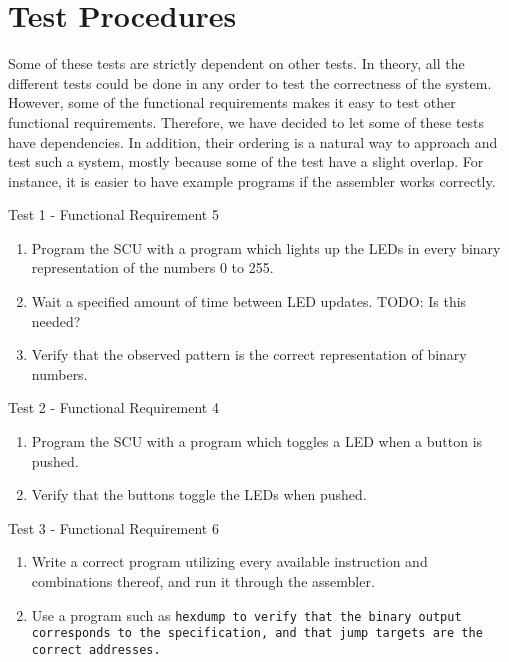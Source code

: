 \section{Test Procedures}

Some of these tests are strictly dependent on other tests. In theory, all the
different tests could be done in any order to test the correctness of the
system. However, some of the functional requirements makes it easy to test other
functional requirements. Therefore, we have decided to let some of these tests
have dependencies. In addition, their ordering is a natural way to approach and
test such a system, mostly because some of the test have a slight overlap. For
instance, it is easier to have example programs if the assembler works
correctly.

{\sc Test 1 - Functional Requirement 5}

{\em \FRV}

\begin{enumerate}
\item Program the \ac{SCU} with a program which lights up the \acp{LED} in every
  binary representation of the numbers 0 to 255.
\item Wait a specified amount of time between \ac{LED} updates. {\sc \color{red}
  TODO: Is this needed?}
\item Verify that the observed pattern is the correct representation of binary
  numbers.
\end{enumerate}

{\sc Test 2 - Functional Requirement 4}

{\em \FRIV}

\begin{enumerate}
\item Program the \ac{SCU} with a program which toggles a \ac{LED} when a button
  is pushed.
\item Verify that the buttons toggle the \acp{LED} when pushed.
\end{enumerate}

{\sc Test 3 - Functional Requirement 6}

{\em \FRVI}

\begin{enumerate}
\item Write a correct program utilizing every available instruction and
  combinations thereof, and run it through the assembler.
\item Use a program such as \tt{hexdump} to verify that the binary output
  corresponds to the specification, and that jump targets are the correct
  addresses.
\end{enumerate}

